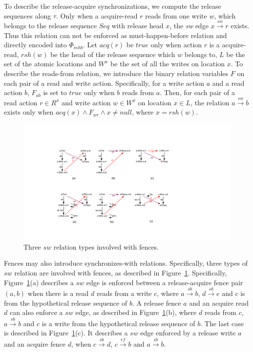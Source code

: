 \documentclass[preprint, numbers, 10pt]{sigplanconf}
\begin{document}
To describe the release-acquire synchronizations, we compute the release sequences
along $\tau$. %
Only when a acquire-read $r$ reads from one write $w$,
which belongs to the release sequence $Seq$ with release head $x$, the \textit{sw} edge 
$x \stackrel{sw}{\longrightarrow} r$ exists. Thus this relation can not be enforced 
as must-happen-before relation and directly encoded into $\Phi_{mhb}$. 
Let $acq(r)$ be $true$ only when action $r$ is a acquire-read,
$rsh(w)$ be the head of the release sequence which $w$ belongs to, 
$L$ be the set of the atomic locations and $W^x$ be the set of all the writes on location $x$. 
To describe the reads-from relation, we introduce the binary relation variables $F$ on each 
pair of a read and write action. Specifically, for a write action $a$ and a read action $b$, 
$F_{ab}$ is set to $true$ only when $b$ reads from $a$.
Then, for each pair of a read action $r\in R^x$ and write action $w\in W^x$ on location $x\in L$,
the relation $a \stackrel{sw}{\longrightarrow} b$ exists only when 
$acq(x)\wedge F_{wr}\wedge x\neq null$, where $x=rsh(w)$. 

\begin{figure}%
\centering\includegraphics[scale=0.45]{fence.pdf} %
\caption{Three $sw$ relation types involved with fences. }
\label{fig:fence}
\end{figure}

Fences may also introduce synchronizes-with relations. Specifically, three types of $sw$ relation
are involved with fences, as described in Figure~\ref{fig:fence}. 
Specifically, Figure~\ref{fig:fence}(a) describes a $sw$ edge is enforced between a
release-acquire fence pair $(a,b)$ when there is a read $d$ reads from a write $c$, where
$a \stackrel{sb}{\longrightarrow} b$, $d \stackrel{sb}{\longrightarrow} e$ and 
$c$ is from the hypothetical release sequence of $b$. A release fence $a$ and an acquire read $d$
can also enforce a $sw$ edge, as described in Figure~\ref{fig:fence}(b), where $d$ reads from 
$c$, $a \stackrel{sb}{\longrightarrow} b$ and $c$ is a write from the hypothetical release sequence of $b$. 
The last case is described in Figure~\ref{fig:fence}(c). It describes a $sw$ edge enforced by a release 
write $a$ and an acquire fence $d$, when $c \stackrel{sb}{\longrightarrow} d$, $c \stackrel{rf}{\longrightarrow} b$
and $a \stackrel{sb}{\longrightarrow} b$.
\end{document}
